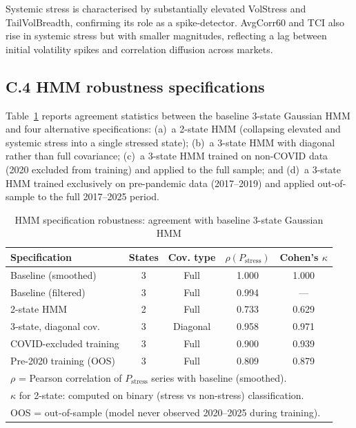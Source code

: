 \documentclass[11pt]{article}
\begin{document}
Systemic stress is characterised by substantially elevated VolStress and TailVolBreadth, confirming its role as a spike-detector. AvgCorr60 and TCI also rise in systemic stress but with smaller magnitudes, reflecting a lag between initial volatility spikes and correlation diffusion across markets.

\subsection*{C.4 HMM robustness specifications}

Table~\ref{tab:hmm_robustness} reports agreement statistics between the baseline 3-state Gaussian HMM and four alternative specifications: (a)~a 2-state HMM (collapsing elevated and systemic stress into a single stressed state); (b)~a 3-state HMM with diagonal rather than full covariance; (c)~a 3-state HMM trained on non-COVID data (2020 excluded from training) and applied to the full sample; and (d)~a 3-state HMM trained exclusively on pre-pandemic data (2017--2019) and applied out-of-sample to the full 2017--2025 period.

\begin{table}[ht]
\centering
\small
\caption{HMM specification robustness: agreement with baseline 3-state Gaussian HMM}
\label{tab:hmm_robustness}
\begin{tabular}{lcccc}
\hline\hline
Specification & States & Cov. type & $\rho(P_{\text{stress}})$ & Cohen's $\kappa$ \\
\hline
Baseline (smoothed)         & 3 & Full     & 1.000 & 1.000 \\
Baseline (filtered)         & 3 & Full     & 0.994 & --- \\
2-state HMM                 & 2 & Full     & 0.733 & 0.629 \\
3-state, diagonal cov.      & 3 & Diagonal & 0.958 & 0.971 \\
COVID-excluded training     & 3 & Full     & 0.900 & 0.939 \\
Pre-2020 training (OOS)     & 3 & Full     & 0.809 & 0.879 \\
\hline\hline
\multicolumn{5}{l}{\footnotesize $\rho$ = Pearson correlation of $P_{\text{stress}}$ series with baseline (smoothed).}\\
\multicolumn{5}{l}{\footnotesize $\kappa$ for 2-state: computed on binary (stress vs non-stress) classification.}\\
\multicolumn{5}{l}{\footnotesize OOS = out-of-sample (model never observed 2020--2025 during training).}
\end{tabular}
\end{table}
\end{document}
